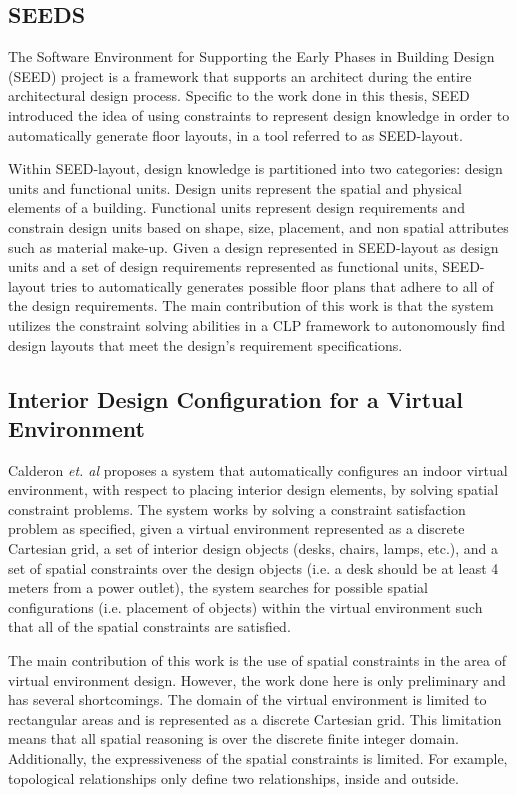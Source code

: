 \documentclass[12pt]{ucthesis}
\begin{document}
\subsection{SEEDS}
The Software Environment for Supporting the Early Phases in Building Design (SEED) project \cite{SEEDS} is a framework that supports an architect during the entire architectural design process. Specific to the work done in this thesis, SEED introduced the idea of using constraints to represent design knowledge in order to automatically generate floor layouts, in a tool referred to as SEED-layout. 

Within SEED-layout, design knowledge is partitioned into two categories: design units and functional units. Design units represent the spatial and physical elements of a building. Functional units represent design requirements and constrain design units based on shape, size, placement, and non spatial attributes such as material make-up. Given a design represented in SEED-layout as design units and a set of design requirements represented as functional units, SEED-layout tries to automatically generates possible floor plans that adhere to all of the design requirements. The main contribution of this work is that the system utilizes the constraint solving abilities in a CLP framework to autonomously find design layouts that meet the design's requirement specifications.


\subsection{Interior Design Configuration for a Virtual Environment}
Calderon \emph{et. al} proposes a system that automatically configures an indoor virtual environment, with respect to placing interior design elements, by solving spatial constraint problems. The system works by solving a constraint satisfaction problem as specified, given a virtual environment represented as a discrete Cartesian grid, a set of interior design objects (desks, chairs, lamps, etc.), and a set of spatial constraints over the design objects (i.e. a desk should be at least 4 meters from a power outlet), the system searches for possible spatial configurations (i.e. placement of objects) within the virtual environment such that all of the spatial constraints are satisfied. 

The main contribution of this work is the use of spatial constraints in the area of virtual environment design. However, the work done here is only preliminary and has several shortcomings. The domain of the virtual environment is limited to rectangular areas and is represented as a discrete Cartesian grid. This limitation means that all spatial reasoning is over the discrete finite integer domain. Additionally, the expressiveness of the spatial constraints is limited. For example, topological relationships only define two relationships, inside and outside. 
\end{document}
